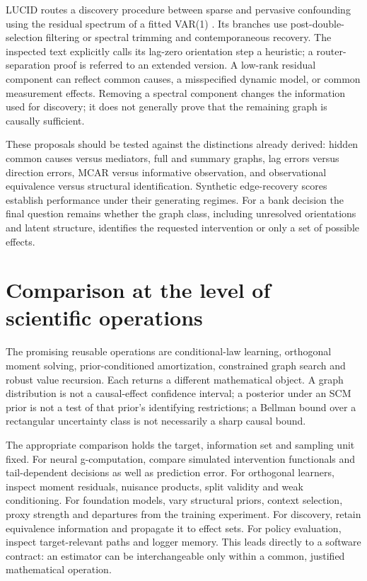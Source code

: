 LUCID routes a discovery procedure between sparse and pervasive
confounding using the residual spectrum of a fitted VAR(1)
\citep[Section 4]{lucid2026}. Its branches use post-double-selection
filtering or spectral trimming and contemporaneous recovery. The
inspected text explicitly calls its lag-zero orientation step a
heuristic; a router-separation proof is referred to an extended version.
A low-rank residual component can reflect common causes, a misspecified
dynamic model, or common measurement effects. Removing a spectral
component changes the information used for discovery; it does not
generally prove that the remaining graph is causally sufficient.

These proposals should be tested against the distinctions already
derived: hidden common causes versus mediators, full and summary graphs,
lag errors versus direction errors, MCAR versus informative observation,
and observational equivalence versus structural identification. Synthetic
edge-recovery scores establish performance under their generating regimes.
For a bank decision the final question remains whether the graph class,
including unresolved orientations and latent structure, identifies the
requested intervention or only a set of possible effects.

\section{Comparison at the level of scientific operations}
\label{r3:recent-contract}

The promising reusable operations are conditional-law learning,
orthogonal moment solving, prior-conditioned amortization, constrained
graph search and robust value recursion. Each returns a different
mathematical object. A graph distribution is not a causal-effect confidence
interval; a posterior under an SCM prior is not a test of that prior's
identifying restrictions; a Bellman bound over a rectangular uncertainty
class is not necessarily a sharp causal bound.

The appropriate comparison holds the target, information set and sampling
unit fixed. For neural g-computation, compare simulated intervention
functionals and tail-dependent decisions as well as prediction error.
For orthogonal learners, inspect moment residuals, nuisance products,
split validity and weak conditioning. For foundation models, vary
structural priors, context selection, proxy strength and departures from
the training experiment. For discovery, retain equivalence information
and propagate it to effect sets. For policy evaluation, inspect
target-relevant paths and logger memory. This leads directly to a
software contract: an estimator can be interchangeable only within a
common, justified mathematical operation.


